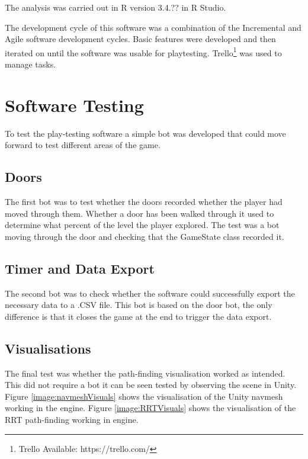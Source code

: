 \documentclass[journal]{IEEEtran}
\begin{document}
	The analysis was carried out in R version 3.4.?? in R Studio.
	
	The development cycle of this software was a combination of the Incremental and Agile software development cycles. Basic features were developed and then iterated on until the software was usable for playtesting. Trello\footnote[5]{Trello Available: https://trello.com/} was used to manage tasks.
	
	\section{Software Testing} \label{softtest}
	To test the play-testing software a simple bot was developed that could move forward to test different areas of the game.
	
	\subsection{Doors}
	The first bot was to test whether the doors recorded whether the player had moved through them. Whether a door has been walked through it used to determine what percent of the level the player explored.
	The test was a bot moving through the door and checking that the GameState class recorded it.
	
	
	\subsection{Timer and Data Export}
	The second bot was to check whether the software could successfully export the necessary data to a .CSV file. This bot is based on the door bot, the only difference is that it closes the game at the end to trigger the data export.  
	
	
	\subsection{Visualisations}
	The final test was whether the path-finding visualisation worked as intended. This did not require a bot it can be seen tested by observing the scene in Unity. Figure \ref{image:navmeshVisuals} shows the visualisation of the Unity navmesh working in the engine.  Figure \ref{image:RRTVisuals} shows the visualisation of the RRT path-finding working in engine.
	
\end{document}
